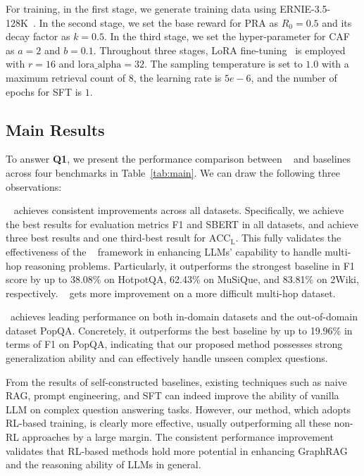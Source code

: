 For training, in the first stage, we generate training data using ERNIE-3.5-128K~\cite{wang2021ernie}.  %
In the second stage, we set the base reward for PRA as $R_0 = 0.5$ and its decay factor as $k=0.5$.
In the third stage, we set the hyper-parameter for CAF as $a=2$ and $b=0.1$. %
Throughout three stages, LoRA fine-tuning~\cite{hu2021lora} is employed with $r=16$ and $\text{lora}\_{\text{alpha}}=32$. 
The sampling temperature is set to $1.0$ with a maximum retrieval count of $8$, the learning rate is $5e-6$, and the number of epochs for SFT is $1$.




\subsection{Main Results}
To answer \textbf{Q1}, we present the performance comparison between \methodname~ and baselines across four benchmarks in Table~\ref{tab:main}.%
We can draw the following three observations:

\methodname~ achieves consistent improvements across all datasets. Specifically, we achieve the best results for evaluation metrics F1 and SBERT in all datasets, and achieve three best results and one third-best result for $\mathrm{ACC_{L}}$.  
This fully validates the effectiveness of the \methodname~ framework in enhancing LLMs' capability to handle multi-hop reasoning problems. Particularly, %
it outperforms the strongest baseline in F1 score by up to 38.08\% on HotpotQA, 62.43\% on MuSiQue, and 83.81\% on 2Wiki, respectively. \methodname~ gets more improvement on a more difficult multi-hop dataset. 

  
\methodname~achieves leading performance on both in-domain datasets
and the out-of-domain dataset PopQA. Concretely, it outperforms the best baseline by up to 19.96\% in terms of F1 on PopQA, indicating that our proposed method possesses strong generalization ability and can effectively handle unseen complex questions. %

From the results of self-constructed baselines, existing techniques such as naive RAG, prompt engineering, and SFT can indeed improve the ability of vanilla LLM on complex question answering tasks. However, our method, which adopts RL-based training, is clearly more effective, usually outperforming all these non-RL approaches by a large margin. The consistent performance improvement validates that RL-based methods hold more potential in enhancing GraphRAG and the reasoning ability of LLMs in general.

